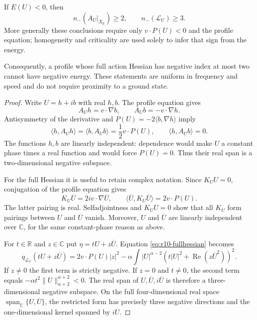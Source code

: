 \begin{theorem}
\label{thm:r10-three-directions}
If $E(U)<0$, then
\begin{equation}\label{eq:r10-index-bound}
 n_-(A_U|_{X_{\mathbb R}})\ge2,
 \qquad n_-(\mathcal L_U)\ge3.
\end{equation}
More generally these conclusions require only $v\cdot P(U)<0$ and
the profile equation; homogeneity and criticality are used solely to
infer that sign from the energy.

Consequently, a profile whose full action Hessian has negative index
at most two cannot have negative energy.  These statements are uniform
in frequency and speed and do not require proximity to a ground state.
\end{theorem}
\begin{proof}
Write $U=h+ib$ with real $h,b$.  The profile equation gives
\[
 A_Uh=v\cdot\nabla b,\qquad A_Ub=-v\cdot\nabla h.
\]
Antisymmetry of the derivative and
$P(U)=-2\langle b,\nabla h\rangle$ imply
\begin{equation}\label{eq:r10-scalar-plane}
 \langle h,A_Uh\rangle=\langle b,A_Ub\rangle
       =\frac12v\cdot P(U),\qquad
 \langle h,A_Ub\rangle=0.
\end{equation}
The functions $h,b$ are linearly independent: dependence would make
$U$ a constant phase times a real function and would force $P(U)=0$.
Thus their real span is a two-dimensional negative subspace.

For the full Hessian it is useful to retain complex notation.
Since $K_UU=0$, conjugation of the profile equation gives
\[
 K_U\overline U=2i v\cdot\nabla\overline U,
 \qquad
 \langle\overline U,K_U\overline U\rangle=2v\cdot P(U).
\]
The latter pairing is real.  Selfadjointness and $K_UU=0$ show
that all $K_U$ form pairings between $U$ and $\overline U$ vanish.
Moreover, $U$ and $\overline U$ are linearly independent over
$\mathbb C$, for the same constant-phase reason as above.

For $t\in\mathbb R$ and $z\in\mathbb C$ put
$\eta=tU+z\overline U$.  Equation \eqref{eq:r10-fullhessian} becomes
\begin{equation}\label{eq:r10-three-plane}
 q_{\mathcal L_U}(tU+z\overline U)
 =2v\cdot P(U)|z|^2
 -\alpha\int |U|^{\alpha-2}
     \left(t|U|^2+\operatorname{Re}(z\overline{U}^{2})\right)^2.
\end{equation}
If $z\ne0$ the first term is strictly negative.  If $z=0$ and
$t\ne0$, the second term equals
$-\alpha t^2\|U\|_{\alpha+2}^{\alpha+2}<0$.
The real span of $U,\overline U,i\overline U$ is therefore a
three-dimensional negative subspace.  On the full four-dimensional
real space $\operatorname{span}_{\mathbb C}\{U,\overline U\}$,
the restricted form has precisely three negative directions and the
one-dimensional kernel spanned by $iU$.
\end{proof}

